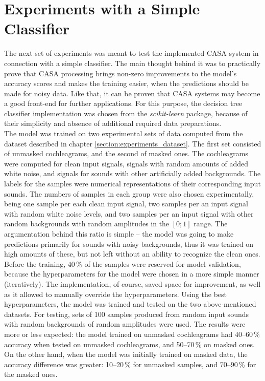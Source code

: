 \section{Experiments with a Simple Classifier}

The next set of experiments was meant to test the implemented CASA system in connection with a simple classifier. The main thought behind it was to practically prove that CASA processing brings non-zero improvements to the model's accuracy scores and makes the training easier, when the predictions should be made for noisy data. Like that, it can be proven that CASA systems may become a good front-end for further applications. For this purpose, the decision tree classifier implementation was chosen from the \textit{scikit-learn} \cite{scikit-learn} package, because of their simplicity and absence of additional required data preparations.\\

The model was trained on two experimental sets of data computed from the dataset described in chapter \ref{section:experiments_dataset}. The first set consisted of unmasked cochleagrams, and the second of masked ones. The cochleagrams were computed for clean input signals, signals with random amounts of added white noise, and signals for sounds with other artificially added backgrounds. The labels for the samples were numerical representations of their corresponding input sounds. The numbers of samples in each group were also chosen experimentally, being one sample per each clean input signal, two samples per an input signal with random white noise levels, and two samples per an input signal with other random backgrounds with random amplitudes in the $[0; 1]$ range. The argumentation behind this ratio is simple -- the model was going to make predictions primarily for sounds with noisy backgrounds, thus it was trained on high amounts of these, but not left without an ability to recognize the clean ones.\\

Before the training, 40\,\% of the samples were reserved for model validation, because the hyperparameters for the model were chosen in a more simple manner (iteratively). The implementation, of course, saved space for improvement, as well as it allowed to manually override the hyperparameters. Using the best hyperparameters, the model was trained and tested on the two above-mentioned datasets. For testing, sets of 100 samples produced from random input sounds with random backgrounds of random amplitudes were used. The results were more or less expected: the model trained on unmasked cochleagrams had 40--60\,\% accuracy when tested on unmasked cochleagrams, and 50--70\,\% on masked ones. On the other hand, when the model was initially trained on masked data, the accuracy difference was greater: 10--20\,\% for unmasked samples, and 70--90\,\% for the masked ones.

